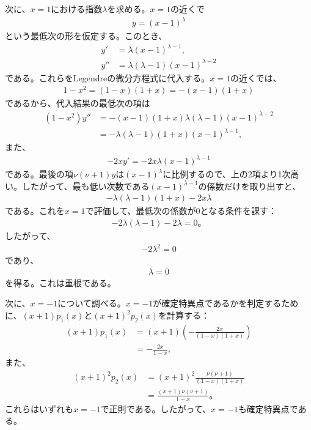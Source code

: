 \documentclass[platex,dvipdfmx,a4paper]{jsarticle}
\begin{document}
  次に、$x=1$における指数$\lambda$を求める。$x=1$の近くで
  \begin{align*}
    y=(x-1)^\lambda
  \end{align*}
  という最低次の形を仮定する。このとき、
  \begin{align*}
    y'&=\lambda(x-1)^{\lambda-1},\\
    y''&=\lambda(\lambda-1)(x-1)^{\lambda-2}
  \end{align*}
  である。これらをLegendreの微分方程式に代入する。$x=1$の近くでは、
  \begin{align*}
    1-x^2=(1-x)(1+x)=-(x-1)(1+x)
  \end{align*}
  であるから、代入結果の最低次の項は
  \begin{align*}
    (1-x^2)y''
    &=
    -(x-1)(1+x)\lambda(\lambda-1)(x-1)^{\lambda-2} \\
    &=
    -\lambda(\lambda-1)(1+x)(x-1)^{\lambda-1},
  \end{align*}
  また、
  \begin{align*}
    -2xy'
    =
    -2x\lambda(x-1)^{\lambda-1}
  \end{align*}
  である。最後の項$\nu(\nu+1)y$は$(x-1)^\lambda$に比例するので、上の2項より1次高い。したがって、最も低い次数である$(x-1)^{\lambda-1}$の係数だけを取り出すと、
  \begin{align*}
    -\lambda(\lambda-1)(1+x)-2x\lambda
  \end{align*}
  である。これを$x=1$で評価して、最低次の係数が$0$となる条件を課す：
  \begin{align*}
    -2\lambda(\lambda-1)-2\lambda=0。
  \end{align*}
  したがって、
  \begin{align*}
    -2\lambda^2=0
  \end{align*}
  であり、
  \begin{align*}
    \lambda=0
  \end{align*}
  を得る。これは重根である。
  
  次に、$x=-1$について調べる。$x=-1$が確定特異点であるかを判定するために、$(x+1)p_1(x)$と$(x+1)^2p_2(x)$を計算する：
  \begin{align*}
    (x+1)p_1(x)
    &=(x+1)\left(-\frac{2x}{(1-x)(1+x)}\right) \\
    &=-\frac{2x}{1-x},
  \end{align*}
  また、
  \begin{align*}
    (x+1)^2p_2(x)
    &=(x+1)^2\frac{\nu(\nu+1)}{(1-x)(1+x)} \\
    &=\frac{(x+1)\nu(\nu+1)}{1-x}。
  \end{align*}
  これらはいずれも$x=-1$で正則である。したがって、$x=-1$も確定特異点である。
  
\end{document}
